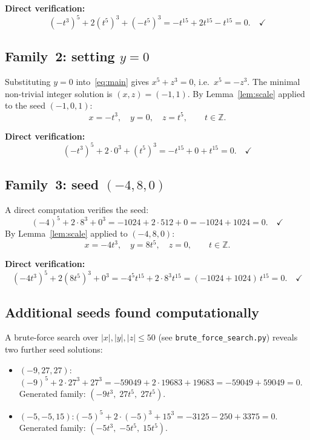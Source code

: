 \documentclass[12pt,a4paper]{article}
\theoremstyle{definition}
\newcommand{\Z}{\mathbb{Z}}
\begin{document}
\textbf{Direct verification:}
\[
  (-t^3)^5 + 2(t^5)^3 + (-t^5)^3 = -t^{15} + 2t^{15} - t^{15} = 0.\quad\checkmark
\]

\subsection{Family~2: setting $y = 0$}\label{sec:fam2}

Substituting $y = 0$ into~\eqref{eq:main} gives $x^5 + z^3 = 0$, i.e.\ $x^5 = -z^3$.
The minimal non-trivial integer solution is $(x, z) = (-1, 1)$.
By Lemma~\ref{lem:scale} applied to the seed $(-1, 0, 1)$:
\[
  x = -t^3,\quad y = 0,\quad z = t^5, \qquad t \in \Z.
\]

\textbf{Direct verification:}
\[
  (-t^3)^5 + 2 \cdot 0^3 + (t^5)^3 = -t^{15} + 0 + t^{15} = 0.\quad\checkmark
\]

\subsection{Family~3: seed $(-4, 8, 0)$}\label{sec:fam3}

A direct computation verifies the seed:
\[
  (-4)^5 + 2 \cdot 8^3 + 0^3 = -1024 + 2 \cdot 512 + 0 = -1024 + 1024 = 0.\quad\checkmark
\]
By Lemma~\ref{lem:scale} applied to $(-4, 8, 0)$:
\[
  x = -4t^3,\quad y = 8t^5,\quad z = 0, \qquad t \in \Z.
\]

\textbf{Direct verification:}
\[
  (-4t^3)^5 + 2(8t^5)^3 + 0^3 = -4^5 t^{15} + 2 \cdot 8^3 t^{15}
  = (-1024 + 1024)\,t^{15} = 0.\quad\checkmark
\]

\subsection{Additional seeds found computationally}

A brute-force search over $|x|,|y|,|z|\leq 50$ (see
\texttt{brute\_force\_search.py}) reveals two further seed solutions:

\begin{itemize}
  \item $(-9, 27, 27)$:\quad $(-9)^5 + 2 \cdot 27^3 + 27^3
    = -59049 + 2 \cdot 19683 + 19683 = -59049 + 59049 = 0$.\\
    Generated family: $(-9t^3,\;27t^5,\;27t^5)$.
  \item $(-5,-5,15)$:\quad $(-5)^5 + 2\cdot(-5)^3 + 15^3
    = -3125 - 250 + 3375 = 0$.\\
    Generated family: $(-5t^3,\;{-5t^5},\;15t^5)$.
\end{itemize}
\end{document}
